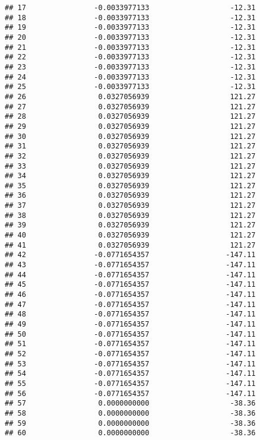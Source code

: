 \documentclass[]{article}
\begin{document}
\begin{verbatim}
## 17                -0.0033977133                   -12.31
## 18                -0.0033977133                   -12.31
## 19                -0.0033977133                   -12.31
## 20                -0.0033977133                   -12.31
## 21                -0.0033977133                   -12.31
## 22                -0.0033977133                   -12.31
## 23                -0.0033977133                   -12.31
## 24                -0.0033977133                   -12.31
## 25                -0.0033977133                   -12.31
## 26                 0.0327056939                   121.27
## 27                 0.0327056939                   121.27
## 28                 0.0327056939                   121.27
## 29                 0.0327056939                   121.27
## 30                 0.0327056939                   121.27
## 31                 0.0327056939                   121.27
## 32                 0.0327056939                   121.27
## 33                 0.0327056939                   121.27
## 34                 0.0327056939                   121.27
## 35                 0.0327056939                   121.27
## 36                 0.0327056939                   121.27
## 37                 0.0327056939                   121.27
## 38                 0.0327056939                   121.27
## 39                 0.0327056939                   121.27
## 40                 0.0327056939                   121.27
## 41                 0.0327056939                   121.27
## 42                -0.0771654357                  -147.11
## 43                -0.0771654357                  -147.11
## 44                -0.0771654357                  -147.11
## 45                -0.0771654357                  -147.11
## 46                -0.0771654357                  -147.11
## 47                -0.0771654357                  -147.11
## 48                -0.0771654357                  -147.11
## 49                -0.0771654357                  -147.11
## 50                -0.0771654357                  -147.11
## 51                -0.0771654357                  -147.11
## 52                -0.0771654357                  -147.11
## 53                -0.0771654357                  -147.11
## 54                -0.0771654357                  -147.11
## 55                -0.0771654357                  -147.11
## 56                -0.0771654357                  -147.11
## 57                 0.0000000000                   -38.36
## 58                 0.0000000000                   -38.36
## 59                 0.0000000000                   -38.36
## 60                 0.0000000000                   -38.36

\end{verbatim}
\end{document}
